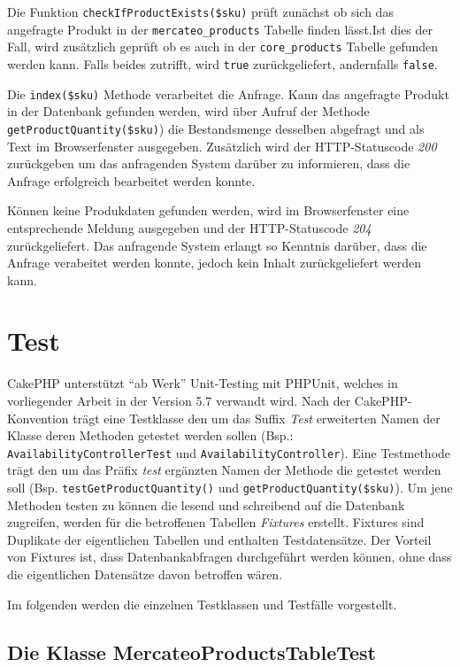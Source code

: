	Die Funktion \texttt{checkIfProductExists(\$sku)} prüft zunächst ob sich das angefragte Produkt in der \texttt{mercateo\_products} Tabelle finden lässt.Ist dies der Fall, wird zusätzlich geprüft ob es auch in der \texttt{core\_products} Tabelle gefunden werden kann. Falls beides zutrifft, wird \texttt{true} zurückgeliefert, andernfalls \texttt{false}.
	
	Die \texttt{index(\$sku)} Methode verarbeitet die Anfrage. Kann das angefragte Produkt in der Datenbank gefunden werden, wird über Aufruf der Methode \texttt{getProductQuantity(\$sku)}) die Bestandsmenge desselben abgefragt und als Text im Browserfenster ausgegeben. Zusätzlich wird der HTTP-Statuscode \textit{200} zurückgeben um das anfragenden System darüber zu informieren, dass die Anfrage erfolgreich bearbeitet werden konnte.
	
	Können keine Produkdaten gefunden werden, wird im Browserfenster eine entsprechende Meldung ausgegeben und der HTTP-Statuscode \textit{204} zurückgeliefert. Das anfragende System erlangt so Kenntnis darüber, dass die Anfrage verabeitet werden konnte, jedoch kein Inhalt zurückgeliefert werden kann.
	
	\section{Test}
	
	
	CakePHP unterstützt \enquote{ab Werk} Unit-Testing mit PHPUnit, welches in vorliegender Arbeit in der Version 5.7 verwandt wird. Nach der CakePHP-Konvention trägt eine Testklasse den um das Suffix \textit{Test} erweiterten Namen der Klasse deren Methoden getestet werden sollen (Bsp.: \texttt{AvailabilityControllerTest} und \texttt{AvailabilityController}).  Eine Testmethode trägt den um das Präfix \textit{test} ergänzten Namen der Methode die getestet werden soll (Bsp. \texttt{testGetProductQuantity()} und \texttt{getProductQuantity(\$sku)}). Um jene Methoden testen zu können die lesend und schreibend auf die Datenbank zugreifen, werden für die betroffenen Tabellen \textit{Fixtures} erstellt. Fixtures sind Duplikate der eigentlichen Tabellen und enthalten Testdatensätze. Der Vorteil von Fixtures ist, dass Datenbankabfragen durchgeführt werden können, ohne dass die eigentlichen Datensätze davon betroffen wären.
	
	Im folgenden werden die einzelnen Testklassen und Testfälle vorgestellt.
	
	\subsection{Die Klasse MercateoProductsTableTest}
	
